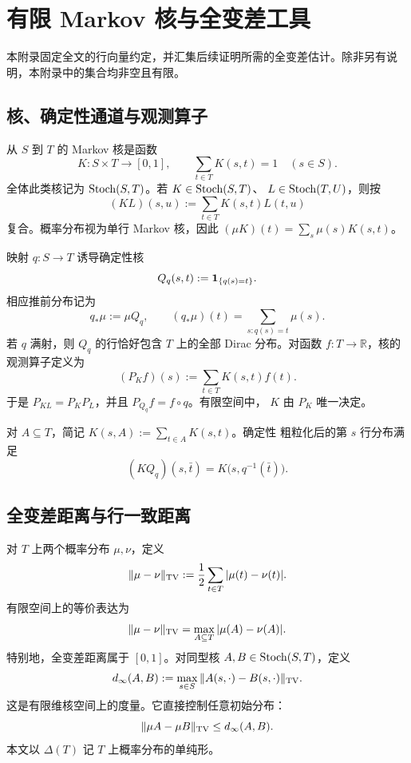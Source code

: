 \section{有限 Markov 核与全变差工具}
\label{app:markov-tv}

本附录固定全文的行向量约定，并汇集后续证明所需的全变差估计。除非另有说明，本附录中的集合均非空且有限。

\subsection{核、确定性通道与观测算子}

从 $S$ 到 $T$ 的 Markov 核是函数
\[
  K:S\times T\longrightarrow[0,1],
  \qquad
  \sum_{t\in T}K(s,t)=1\quad(s\in S).
\]
全体此类核记为 $\operatorname{Stoch}(S,T)$。若 $K\in\operatorname{Stoch}(S,T)$、
$L\in\operatorname{Stoch}(T,U)$，则按
\[
  (KL)(s,u):=\sum_{t\in T}K(s,t)L(t,u)
\]
复合。概率分布视为单行 Markov 核，因此 $(\mu K)(t)=
\sum_s\mu(s)K(s,t)$。

映射 $q:S\to T$ 诱导确定性核
\[
  Q_q(s,t):=\mathbf 1_{\{q(s)=t\}}.
\]
相应推前分布记为
\[
  q_*\mu:=\mu Q_q,
  \qquad
  (q_*\mu)(t)=\sum_{s:q(s)=t}\mu(s).
\]
若 $q$ 满射，则 $Q_q$ 的行恰好包含 $T$ 上的全部 Dirac 分布。对函数
$f:T\to\mathbb R$，核的观测算子定义为
\[
  (P_Kf)(s):=\sum_{t\in T}K(s,t)f(t).
\]
于是 $P_{KL}=P_KP_L$，并且 $P_{Q_q}f=f\circ q$。有限空间中，
$K$ 由 $P_K$ 唯一决定。

对 $A\subseteq T$，简记 $K(s,A):=\sum_{t\in A}K(s,t)$。确定性
粗粒化后的第 $s$ 行分布满足
\[
  (KQ_q)(s,\bar t)=K\bigl(s,q^{-1}(\bar t)\bigr).
\]

\subsection{全变差距离与行一致距离}

对 $T$ 上两个概率分布 $\mu,\nu$，定义
\begin{equation}
  \|\mu-\nu\|_{\operatorname{TV}}
  :=\frac12\sum_{t\in T}|\mu(t)-\nu(t)|.
  \label{eq:app-tv-def}
\end{equation}
有限空间上的等价表达为
\begin{equation}
  \|\mu-\nu\|_{\operatorname{TV}}
  =\max_{A\subseteq T}|\mu(A)-\nu(A)|.
  \label{eq:app-tv-events}
\end{equation}
特别地，全变差距离属于 $[0,1]$。对同型核 $A,B\in\operatorname{Stoch}(S,T)$，定义
\begin{equation}
  d_\infty(A,B)
  :=\max_{s\in S}\|A(s,\cdot)-B(s,\cdot)\|_{\operatorname{TV}}.
  \label{eq:app-dinfty}
\end{equation}
这是有限维核空间上的度量。它直接控制任意初始分布：
\begin{equation}
  \|\mu A-\mu B\|_{\operatorname{TV}}\le d_\infty(A,B).
  \label{eq:app-mixture-bound}
\end{equation}
本文以 $\Delta(T)$ 记 $T$ 上概率分布的单纯形。

